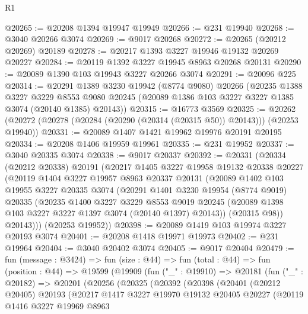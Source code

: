 \begin{lexlean}{R1}
\begin{coremodule}
@20265 := @20208 @1394 @19947 @19949
@20266 := @231 @19940
@20268 := @3040 @20266 @3074
@20269 := @9017 @20268
@20272 := @20265 (@20212 @20269) @20189
@20278 := @20217 @1393 @3227 @19946 @19132 @20269 @20227
@20284 := @20119 @1392 @3227 @19945 @8963 @20268 @20131
@20290 := @20089 @1390 @103 @19943 @3227 @20266 @3074
@20291 := @20096 @225
@20314 := @20291
    @1389
    @3230
    @19942
    (@8774 @9080)
    @20266
    (@20235
      @1388
      @3227
      @3229
      @8553
      @9080
      @20245
      (@20089 @1386 @103 @3227 @3227 @1385 @3074 (@20140 @1385) @20143))
@20315 := @16773 @3569
@20325 := @20262 (@20272 (@20278 (@20284 (@20290 (@20314 (@20315 @50)) @20143))) (@20253 @19940))
@20331 := @20089 @1407 @1421 @19962 @19976 @20191 @20195
@20334 := @20208 @1406 @19959 @19961
@20335 := @231 @19952
@20337 := @3040 @20335 @3074
@20338 := @9017 @20337
@20392 := @20331
    (@20334
      (@20212 @20338)
      @20191
      (@20217
        @1405
        @3227
        @19958
        @19132
        @20338
        @20227
        (@20119
          @1404
          @3227
          @19957
          @8963
          @20337
          @20131
          (@20089
            @1402
            @103
            @19955
            @3227
            @20335
            @3074
            (@20291
              @1401
              @3230
              @19954
              (@8774 @9019)
              @20335
              (@20235
                @1400
                @3227
                @3229
                @8553
                @9019
                @20245
                (@20089 @1398 @103 @3227 @3227 @1397 @3074 (@20140 @1397) @20143))
              (@20315 @98))
            @20143)))
      (@20253 @19952))
@20398 := @20089 @1419 @103 @19974 @3227 @20193 @3074
@20401 := @20208 @1418 @19971 @19973
@20402 := @231 @19964
@20404 := @3040 @20402 @3074
@20405 := @9017 @20404
@20479 := fun (message : @3424) =>
  fun (size : @44) =>
  fun (total : @44) =>
  fun (position : @44) =>
  @19599
    (@19909
      (fun ("_" : @19910) =>
      @20181
        (fun ("_" : @20182) =>
        @20201
          (@20256
            (@20325
              (@20392
                (@20398
                  (@20401
                    (@20212 @20405)
                    @20193
                    (@20217
                      @1417
                      @3227
                      @19970
                      @19132
                      @20405
                      @20227
                      (@20119
                        @1416
                        @3227
                        @19969
                        @8963

\end{coremodule}
\end{lexlean}
